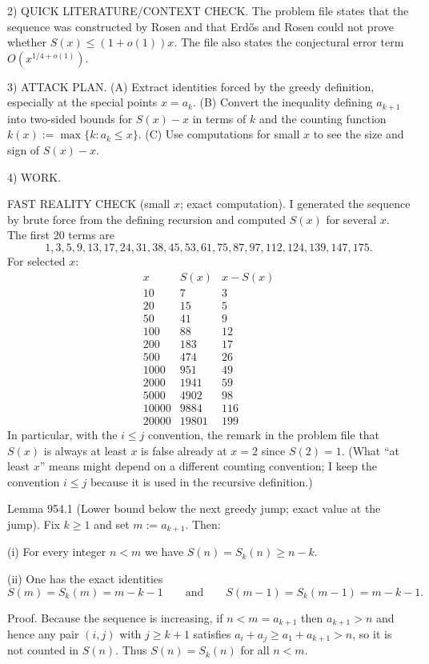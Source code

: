 2) QUICK LITERATURE/CONTEXT CHECK.
The problem file states that the sequence was constructed by Rosen and that Erd\H{o}s and Rosen could not prove whether $S(x)\le (1+o(1))x$. The file also states the conjectural error term $O(x^{1/4+o(1)})$.

3) ATTACK PLAN.
(A) Extract identities forced by the greedy definition, especially at the special points $x=a_k$.
(B) Convert the inequality defining $a_{k+1}$ into two-sided bounds for $S(x)-x$ in terms of $k$ and the counting function $k(x):=\max\{k: a_k\le x\}$.
(C) Use computations for small $x$ to see the size and sign of $S(x)-x$.

4) WORK.

FAST REALITY CHECK (small $x$; exact computation).
I generated the sequence by brute force from the defining recursion and computed $S(x)$ for several $x$.
The first 20 terms are
\[
1,3,5,9,13,17,24,31,38,45,53,61,75,87,97,112,124,139,147,175.
\]
For selected $x$:
\[
\begin{array}{c|c|c}
 x & S(x) & x-S(x)\\\hline
 10 & 7 & 3\\
 20 & 15 & 5\\
 50 & 41 & 9\\
 100 & 88 & 12\\
 200 & 183 & 17\\
 500 & 474 & 26\\
 1000 & 951 & 49\\
 2000 & 1941 & 59\\
 5000 & 4902 & 98\\
 10000 & 9884 & 116\\
 20000 & 19801 & 199
\end{array}
\]
In particular, with the $i\le j$ convention, the remark in the problem file that $S(x)$ is always at least $x$ is false already at $x=2$ since $S(2)=1$.
(What “at least $x$” means might depend on a different counting convention; I keep the convention $i\le j$ because it is used in the recursive definition.)

Lemma 954.1 (Lower bound below the next greedy jump; exact value at the jump).
Fix $k\ge 1$ and set $m:=a_{k+1}$. Then:

(i) For every integer $n<m$ we have $S(n)=S_k(n)\ge n-k$.

(ii) One has the exact identities
\[
S(m)=S_k(m)=m-k-1\qquad\text{and}\qquad S(m-1)=S_k(m-1)=m-k-1.
\]

Proof.
Because the sequence is increasing, if $n<m=a_{k+1}$ then $a_{k+1}>n$ and hence any pair $(i,j)$ with $j\ge k+1$ satisfies $a_i+a_j\ge a_1+a_{k+1}>n$, so it is not counted in $S(n)$. Thus $S(n)=S_k(n)$ for all $n<m$.

